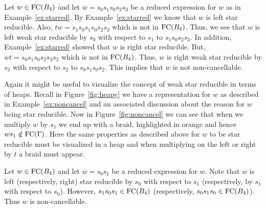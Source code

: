 \begin{example}\label{ex:noncancel}
Let $w \in \mathrm{FC}(B_4)$ and let $\overline{w}=s_0s_1s_0s_2s_3$ be a reduced expression for $w$ as in Example~\ref{ex:starred}. By Example~\ref{ex:starred} we know that $w$ is left star reducible. Also, $tw=s_1s_0s_1s_0s_2s_3$ which is not in $\mathrm{FC}(B_4)$. Thus, we see that $w$ is left weak star reducible by $s_0$ with respect to $s_1$ to $s_1s_0s_2s_3$. In addition, Example~\ref{ex:starred} showed that $w$ is right star reducible. But, $wt=s_0s_1s_0s_2s_3s_2$ which is not in $\mathrm{FC}(B_4)$. Thus, $w$ is right weak star reducible by $s_3$ with respect to $s_2$ to $s_0s_1s_0s_2$. This implies that $w$ is not non-cancellable.
\end{example}

Again it might be useful to visualize the concept of weak star reducible in terms of heaps. Recall in Figure~\ref{fig:heapy} we have a representation for $w$ as described in Example~\ref{ex:noncancel} and an associated discussion about the reason for $w$ being star reducible. Now in Figure~\ref{fig:noncancel} we can see that when we multiply $w$ by $s_1$ we end up with a braid, highlighted in orange and hence $ws_1 \notin \mathrm{FC}(\Gamma)$. Here the same properties as described above for $w$ to be star reducible must be visualized in a heap and when multiplying on the left or right by $t$ a braid must appear.

\begin{figure*}[h!] \centering
{}
\caption{\textcolor{red}{I don't know what to call this either.}} \label{fig:noncancel}
\end{figure*}

\begin{example}
Let $w \in \mathrm{FC}(B_4)$ and let $\overline{w}=s_0s_1$ be a reduced expression for $w$. Note that $w$ is left (respectively, right) star reducible by $s_0$ with respect to $s_1$ (respectively, by $s_1$ with respect to $s_0$). However, $s_1s_0s_1 \in \mathrm{FC}(B_4)$ (respectively, $s_0s_1s_0 \in \mathrm{FC}(B_4)$). Thus $w$ is non-cancellable.
\end{example}

